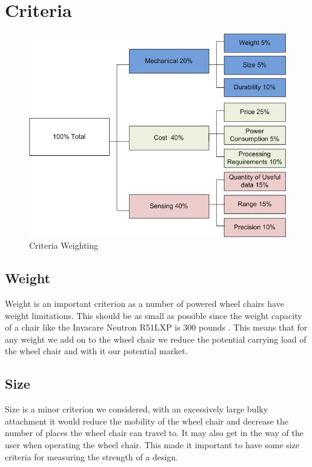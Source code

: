 \documentclass[oneside,final,a4paper]{report}
\begin{document}
\section{Criteria}
\begin{figure}[hbt]
 \centering
 \includegraphics[scale=0.5]{CriteriaWeighting}
 \caption{Criteria Weighting} \label{fig:criteria_weighting}
\end{figure}

\subsection{Weight}
Weight is an important criterion as a number of powered wheel chairs have weight limitations. This should be as small as possible since the weight capacity of a chair like the Invacare Neutron R51LXP is 300 pounds \cite{wheelchair_data}. This means that for any weight we add on to the wheel chair we reduce the potential carrying load of the wheel chair and with it our potential market.

\subsection{Size}
Size is a minor criterion we considered, with an excessively large bulky attachment it would reduce the mobility of the wheel chair and decrease the number of places the wheel chair can travel to. It may also get in the way of the user when operating the wheel chair. This made it important to have some size criteria for measuring the strength of a design.
\end{document}
